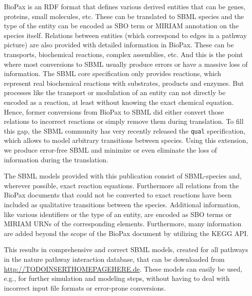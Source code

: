 \documentclass{bioinfo}
\newcommand{\qual}{\texttt{qual}}
\begin{document}
BioPax is an RDF format that defines various derived entities that can be genes, proteins, small molecules, etc. These can be translated to SBML species and the type of the entity can be encoded as SBO term or MIRIAM annotation on the species itself. Relations between entities (which correspond to edges in a pathway picture) are also provided with detailed information in BioPax. These can be transports, biochemical reactions, complex assemblies, etc. And this is the point where most conversions to SBML usually produce errors or have a massive loss of information. The SBML core specification only provides reactions, which represent real biochemical reactions with substrates, products and enzymes. But processes like the transport or modulation of an entity can not directly be encoded as a reaction, at least without knowing the exact chemical equation. Hence, former conversions from BioPax to SBML did either convert those relations to incorrect reactions or simply remove them during translation. To fill this gap, the SBML community has very recently released the \qual{} specification, which allows to model arbitrary transitions between species. Using this extension, we produce error-free SBML and minimize or even eliminate the loss of information during the translation.

The SBML models provided with this publication consist of SBML-species and, wherever possible, exact reaction equations. Furthermore all relations from the BioPax documents that could not be converted to exact reactions have been included as qualitative transitions between the species. Additional information, like various identifiers or the type of an entity, are encoded as SBO terms or MIRIAM URNs of the corresponding elements. Furthermore, many information are added beyond the scope of the BioPax document by utilizing the KEGG API.

This results in comprehensive and correct SBML models, created for all pathways in the nature pathway interaction database, that can be downloaded from \href{http://TODO_INSERT_HOMEPAGE_HERE.de}{http://TODOINSERTHOMEPAGEHERE.de}. These models can easily be used, e.g., for further simulation and modeling steps, without having to deal with incorrect input file formats or error-prone conversions.

\end{document}

